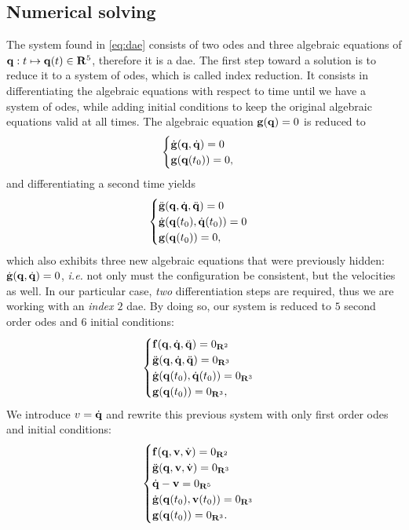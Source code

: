 \subsection{Numerical solving}
The system found in \eqref{eq:dae} consists of two \ac{ode}s and three algebraic equations of $\vb q : t \mapsto \vb q(t) \in \mathbf{R}^5$, therefore it is a \ac{dae}.
The first step toward a solution is to reduce it to a system of \ac{ode}s, which is called index reduction.
It consists in differentiating the algebraic equations with respect to time until we have a system of \ac{ode}s, while adding initial conditions to keep the original algebraic equations valid at all times.
The algebraic equation $\vb g(\vb q) = 0$ is reduced to
\begin{equation}\begin{cases} \dot{\vb g}(\vb q, \dot{\vb q}) = 0 \\ \vb g(\vb q(t_0)) = 0,\end{cases}\end{equation}
and differentiating a second time yields
\begin{equation}\begin{cases} \ddot{\vb g}(\vb q, \dot{\vb q}, \ddot{\vb q}) = 0 \\ \dot{\vb g}(\vb q(t_0), \dot{\vb q}(t_0)) = 0 \\ \vb g(\vb q(t_0)) = 0,\end{cases}\end{equation}
which also exhibits three new algebraic equations that were previously hidden: $\dot{\vb g}(\vb q, \dot{\vb q}) = 0$, \emph{i.e.} not only must the configuration be consistent, but the velocities as well.
In our particular case, \emph{two} differentiation steps are required, thus we are working with an \emph{index $2$} \ac{dae}.
By doing so, our system is reduced to $5$ second order \ac{ode}s and $6$ initial conditions:
\begin{equation}\begin{cases}
    \vb f(\vb q, \dot{\vb q}, \ddot{\vb q}) = 0_{\mathbf{R}^2} \\
    \ddot{\vb g}(\vb q, \dot{\vb q}, \ddot{\vb q}) = 0_{\mathbf{R}^3} \\
    \dot{\vb g}(\vb q(t_0), \dot{\vb q}(t_0)) = 0_{\mathbf{R}^3} \\
    \vb g(\vb q(t_0)) = 0_{\mathbf{R}^3},
\end{cases}\end{equation}
We introduce $v = \dot{\vb q}$ and rewrite this previous system with only first order \ac{ode}s and initial conditions:
\begin{equation}\begin{cases}
    \vb f(\vb q, \vb v, \dot{\vb v}) = 0_{\mathbf{R}^2} \\
    \ddot{\vb g}(\vb q, \vb v, \dot{\vb v}) = 0_{\mathbf{R}^3} \\
    \dot{\vb q} - \vb v = 0_{\mathbf{R}^5} \\
    \dot{\vb g}(\vb q(t_0), \vb v(t_0)) = 0_{\mathbf{R}^3} \\
    \vb g(\vb q(t_0)) = 0_{\mathbf{R}^3}.
\end{cases}\end{equation}
